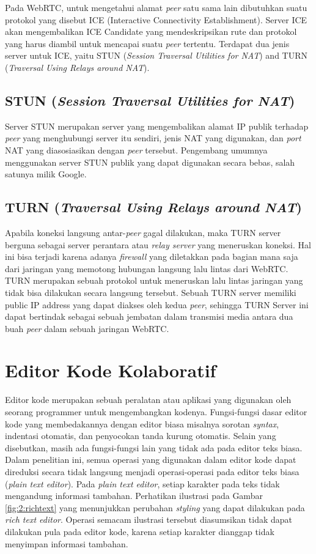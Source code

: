 Pada WebRTC, untuk mengetahui alamat \textit{peer} satu sama lain dibutuhkan suatu protokol yang disebut ICE (Interactive Connectivity Establishment). Server ICE akan mengembalikan ICE Candidate yang mendeskripsikan rute dan protokol yang harus diambil untuk mencapai suatu \textit{peer} tertentu. Terdapat dua jenis server untuk ICE, yaitu STUN (\textit{Session Traversal Utilities for NAT}) and TURN (\textit{Traversal Using Relays around NAT}).

\subsection{STUN (\textit{Session Traversal Utilities for NAT})}

Server STUN merupakan server yang mengembalikan alamat IP publik terhadap \textit{peer} yang menghubungi server itu sendiri, jenis NAT yang digunakan, dan \textit{port} NAT yang diasosiasikan dengan \textit{peer} tersebut. Pengembang umumnya menggunakan server STUN publik yang dapat digunakan secara bebas, salah satunya milik Google.

\subsection{TURN (\textit{Traversal Using Relays around NAT})}

Apabila koneksi langsung antar-\textit{peer} gagal dilakukan, maka TURN server berguna sebagai server perantara atau \textit{relay server} yang meneruskan koneksi. Hal ini bisa terjadi karena adanya \textit{firewall} yang diletakkan pada bagian mana saja dari jaringan yang memotong hubungan langsung lalu lintas dari WebRTC. TURN merupakan sebuah protokol untuk meneruskan lalu lintas jaringan yang tidak bisa dilakukan secara langsung tersebut. Sebuah TURN server memiliki public IP address yang dapat diakses oleh kedua \textit{peer}, sehingga TURN Server ini dapat bertindak sebagai sebuah jembatan dalam transmisi media antara dua buah \textit{peer} dalam sebuah jaringan WebRTC.

\section{Editor Kode Kolaboratif}

Editor kode merupakan sebuah peralatan atau aplikasi yang digunakan oleh seorang programmer untuk mengembangkan kodenya. Fungsi-fungsi dasar editor kode yang membedakannya dengan editor biasa misalnya sorotan \textit{syntax}, indentasi otomatis, dan penyocokan tanda kurung otomatis. Selain yang disebutkan, masih ada fungsi-fungsi lain yang tidak ada pada editor teks biasa. Dalam penelitian ini, semua operasi yang digunakan dalam editor kode dapat direduksi secara tidak langsung menjadi operasi-operasi pada editor teks biasa (\textit{plain text editor}). Pada \textit{plain text editor}, setiap karakter pada teks tidak mengandung informasi tambahan. Perhatikan ilustrasi pada Gambar \ref{fig:2:richtext} yang menunjukkan perubahan \textit{styling} yang dapat dilakukan pada \textit{rich text editor}. Operasi semacam ilustrasi tersebut diasumsikan tidak dapat dilakukan pula pada editor kode, karena setiap karakter dianggap tidak menyimpan informasi tambahan.

